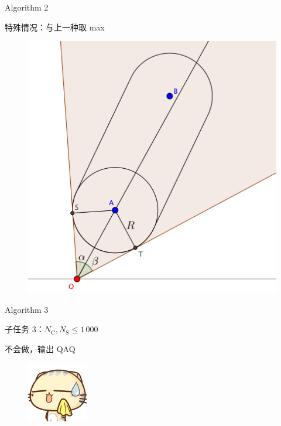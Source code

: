 \documentclass[UTF8]{beamer}
\begin{document}
\begin{frame}{Algorithm 2}

特殊情况：与上一种取 max

\begin{figure}[h]\centering
\includegraphics[scale=0.4]{a3.png}
\end{figure}

\end{frame}

\begin{frame}{Algorithm 3}

子任务 3：$N_\mathrm{C}, N_\mathrm{S} \leq 1\,000$ \newline

不会做，输出 QAQ

\begin{figure}[h]\centering
\includegraphics[scale=0.5]{xx.png}
\end{figure}

\end{frame}
\end{document}
